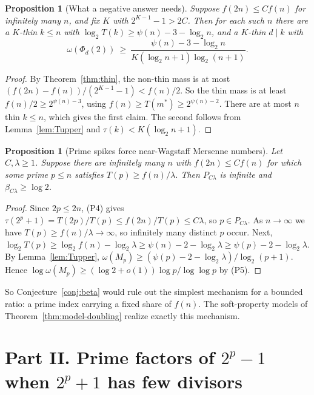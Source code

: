 \documentclass[11pt]{amsart}
\newtheorem{proposition}[theorem]{Proposition}
\theoremstyle{definition}
\theoremstyle{remark}
\begin{document}
\begin{proposition}[What a negative answer needs]\label{prop:negative}
Suppose $f(2n)\le Cf(n)$ for infinitely many $n$, and fix $K$ with $2^{K-1}-1>2C$. Then for each such $n$ there are a
$K$-thin $k\le n$ with $\log_2T(k)\ge\psi(n)-3-\log_2n$, and a $K$-thin $d\mid k$ with
\[
\omega(\Phi_d(2))\ \ge\ \frac{\psi(n)-3-\log_2n}{K(\log_2n+1)\log_2(n+1)}.
\]
\end{proposition}
\begin{proof}
By Theorem~\ref{thm:thin}, the non-thin mass is at most $(f(2n)-f(n))/(2^{K-1}-1)<f(n)/2$. So the thin mass is at
least $f(n)/2\ge2^{\psi(n)-3}$, using $f(n)\ge T(m^*)\ge2^{\psi(n)-2}$. There are at most $n$ thin $k\le n$,
which gives the first claim. The second follows from Lemma~\ref{lem:Tupper} and $\tau(k)<K(\log_2n+1)$.
\end{proof}

\begin{proposition}[Prime spikes force near-Wagstaff Mersenne numbers]\label{prop:spike}
Let $C,\lambda\ge1$. Suppose there are infinitely many $n$ with $f(2n)\le Cf(n)$ for which some prime $p\le n$
satisfies $T(p)\ge f(n)/\lambda$. Then $P_{C\lambda}$ is infinite and $\beta_{C\lambda}\ge\log2$.
\end{proposition}
\begin{proof}
Since $2p\le2n$, (P4) gives $\tau(2^p+1)=T(2p)/T(p)\le f(2n)/T(p)\le C\lambda$, so $p\in P_{C\lambda}$. As
$n\to\infty$ we have $T(p)\ge f(n)/\lambda\to\infty$, so infinitely many distinct $p$ occur. Next,
$\log_2T(p)\ge\log_2f(n)-\log_2\lambda\ge\psi(n)-2-\log_2\lambda\ge\psi(p)-2-\log_2\lambda$. By
Lemma~\ref{lem:Tupper}, $\omega(M_p)\ge(\psi(p)-2-\log_2\lambda)/\log_2(p+1)$. Hence
$\log\omega(M_p)\ge(\log2+o(1))\log p/\log\log p$ by (P5).
\end{proof}

So Conjecture~\ref{conj:beta} would rule out the simplest mechanism for a bounded ratio: a prime index carrying a
fixed share of $f(n)$. The soft-property models of Theorem~\ref{thm:model-doubling} realize exactly this mechanism.

\part*{Part II. Prime factors of \texorpdfstring{$2^p-1$}{2\textasciicircum p-1} when \texorpdfstring{$2^p+1$}{2\textasciicircum p+1} has few divisors}
\end{document}
